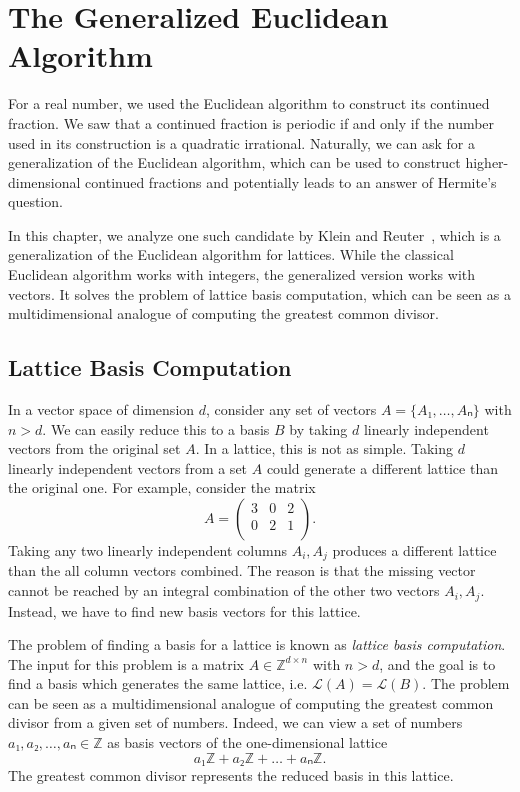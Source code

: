 \chapter{The Generalized Euclidean Algorithm}
\label{ch:generalized-euclidean}

For a real number, we used the Euclidean algorithm to construct its continued
fraction.
We saw that a continued fraction is periodic if and only if the number used in
its construction is a quadratic irrational.
Naturally, we can ask for a generalization of the Euclidean algorithm,
which can be used to construct higher-dimensional continued fractions
and potentially leads to an answer of Hermite's question.

In this chapter, we analyze one such candidate by Klein and Reuter~\cite{Klein24},
which is a generalization of the Euclidean algorithm for lattices.
While the classical Euclidean algorithm works with integers,
the generalized version works with vectors.
It solves the problem of lattice basis computation,
which can be seen as a multidimensional analogue of computing the greatest
common divisor.

\section{Lattice Basis Computation}
\label{sec:lattice-basis-computation}

In a vector space of dimension $d$, consider any set of vectors $A = \{A₁, …, Aₙ\}$ with $n > d$.
We can easily reduce this to a basis $B$ by taking $d$ linearly independent vectors from the original set $A$.
In a lattice, this is not as simple.
Taking $d$ linearly independent vectors from a set $A$ could generate a
different lattice than the original one.
For example, consider the matrix
\[
  A = \begin{pmatrix}
    3 & 0 & 2 \\
    0 & 2 & 1 \\
  \end{pmatrix}.
\]
Taking any two linearly independent columns $A_i, A_j$
produces a different lattice than the all column vectors combined.
The reason is that the missing vector cannot be reached by an
integral combination of the other two vectors $A_i, A_j$.
Instead, we have to find new basis vectors for this lattice.

The problem of finding a basis for a lattice is known as \emph{lattice basis computation}.
The input for this problem is a matrix $A ∈ ℤ^{d×n}$ with $n > d$, and the goal
is to find a basis which generates the same lattice,
i.e. $\mathcal L(A) = \mathcal L(B)$.
The problem can be seen as a multidimensional analogue of
computing the greatest common divisor from a given set of numbers.
Indeed, we can view a set of numbers $a₁, a₂, …, aₙ ∈ ℤ$ as basis vectors
of the one-dimensional lattice
\[
  a₁ℤ + a₂ ℤ + \dots + aₙ ℤ.
\]
The greatest common divisor represents the reduced basis in this lattice.

